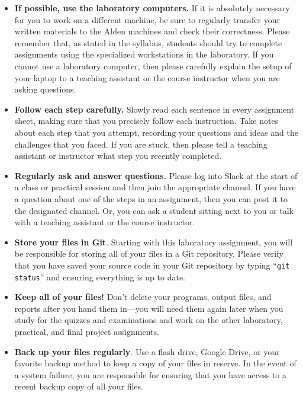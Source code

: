 \vspace*{-.1in}
\begin{itemize}
  \setlength{\itemsep}{-.01in}

\item {\bf If possible, use the laboratory computers.} If it is absolutely necessary for you to work on a different
  machine, be sure to regularly transfer your written materials to the Alden machines and check their correctness.
  Please remember that, as stated in the syllabus, students should try to complete assignments using the specialized
  workstations in the laboratory. If you cannot use a laboratory computer, then please carefully explain the setup of
  your laptop to a teaching assistant or the course instructor when you are asking questions.

\item {\bf Follow each step carefully.} Slowly read each sentence in every assignment sheet, making sure that you
  precisely follow each instruction. Take notes about each step that you attempt, recording your questions and ideas
  and the challenges that you faced. If you are stuck, then please tell a teaching assistant or instructor what step
  you recently completed.

\item {\bf Regularly ask and answer questions.} Please log into Slack at the start of a class or practical session and
  then join the appropriate channel. If you have a question about one of the steps in an assignment, then you can post
  it to the designated channel. Or, you can ask a student sitting next to you or talk with a teaching assistant or the
  course instructor.

\item {\bf Store your files in Git}. Starting with this laboratory assignment, you will be responsible for storing all
  of your files in a Git repository. Please verify that you have saved your source code in your Git repository by
  typing ``{\tt git status}'' and ensuring everything is up to date.

\item {\bf Keep all of your files!} Don't delete your programs, output files, and reports after you hand them in---you
  will need them again later when you study for the quizzes and examinations and work on the other laboratory,
  practical, and final project assignments.

\item {\bf Back up your files regularly}. Use a flash drive, Google Drive, or your favorite backup method to keep a
  copy of your files in reserve. In the event of a system failure, you are responsible for ensuring that you have
  access to a recent backup copy of all your files.


\end{itemize}


